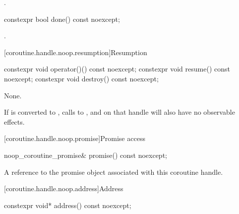 \begin{itemdescr}
\pnum \returns {}.
\end{itemdescr}

%
\begin{itemdecl}
constexpr bool done() const noexcept;
\end{itemdecl}

\begin{itemdescr}
\pnum \returns {}.
\end{itemdescr}

[coroutine.handle.noop.resumption]{Resumption}

%
%
%
\begin{itemdecl}
constexpr void operator()() const noexcept;
constexpr void resume() const noexcept;
constexpr void destroy() const noexcept;
\end{itemdecl}

\begin{itemdescr}
\pnum \effects None.

\pnum
\remarks
If  is converted to ,
calls to ,  and  on that handle
will also have no observable effects.
\end{itemdescr}

[coroutine.handle.noop.promise]{Promise access}

%
\begin{itemdecl}
noop_coroutine_promise& promise() const noexcept;
\end{itemdecl}

\begin{itemdescr}
\pnum \returns A reference to the promise object associated with this
coroutine handle.
\end{itemdescr}

[coroutine.handle.noop.address]{Address}

%
\begin{itemdecl}
constexpr void* address() const noexcept;
\end{itemdecl}

